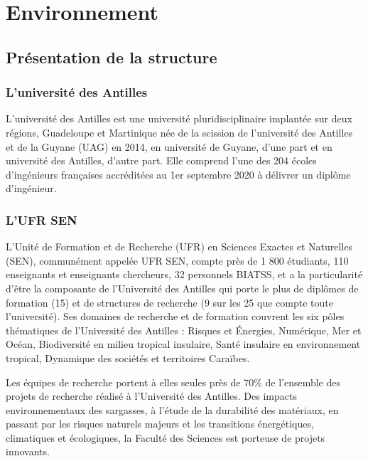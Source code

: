 \chapter{Environnement}
    \label{Chapitre 2}
    \section{Présentation de la structure}
        \subsection{L'université des Antilles}
        L’université des Antilles est une université pluridisciplinaire implantée sur deux régions, Guadeloupe et Martinique née de la scission de l’université des Antilles et de la Guyane (UAG) en 2014, en université de Guyane, d’une part et en université des Antilles, d’autre part.
        Elle comprend l'une des 204 écoles d'ingénieurs françaises accréditées au 1er septembre 2020 à délivrer un diplôme d'ingénieur.

        \subsection{L'UFR SEN}
        L’Unité de Formation et de Recherche (UFR) en Sciences Exactes et Naturelles (SEN), communément appelée UFR SEN, compte près de 1 800 étudiants, 110 enseignants et enseignants chercheurs, 32 personnels BIATSS, et a la particularité d’être la composante de l’Université des Antilles qui porte le plus de diplômes de formation (15) et de structures de recherche (9 sur les 25 que compte toute l’université). 
        Ses domaines de recherche et de formation couvrent les six pôles thématiques de l’Université des Antilles : Risques et Énergies, Numérique, Mer et Océan, Biodiversité en milieu tropical insulaire, Santé insulaire en environnement tropical, Dynamique des sociétés et territoires Caraïbes.

        \vspace{0.2cm}

        Les équipes de recherche portent à elles seules près de 70\% de l’ensemble des projets de recherche réalisé à l’Université des Antilles.
        Des impacts environnementaux des sargasses, à l’étude de la durabilité des matériaux, en passant par les risques naturels majeurs et les transitions énergétiques, climatiques et écologiques, la Faculté des Sciences est porteuse de projets innovants. 

